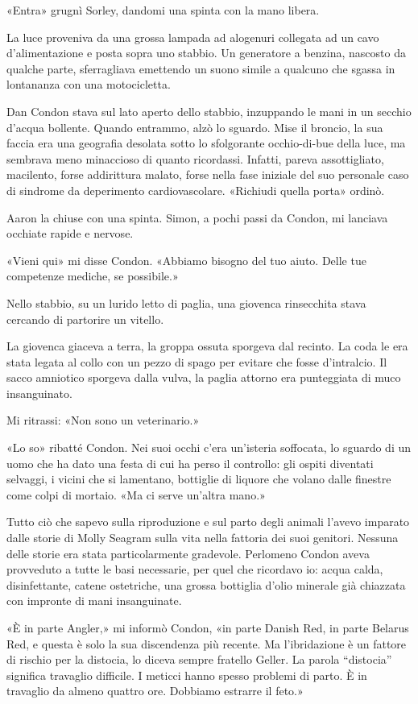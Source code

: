 «Entra» grugnì Sorley, dandomi una spinta con la mano libera.

La luce proveniva da una grossa lampada ad alogenuri collegata ad un
cavo d'alimentazione e posta sopra uno stabbio. Un generatore a benzina,
nascosto da qualche parte, sferragliava emettendo un suono simile a
qualcuno che sgassa in lontananza con una motocicletta.

Dan Condon stava sul lato aperto dello stabbio, inzuppando le mani in un
secchio d'acqua bollente. Quando entrammo, alzò lo sguardo. Mise il
broncio, la sua faccia era una geografia desolata sotto lo sfolgorante
occhio-di-bue della luce, ma sembrava meno minaccioso di quanto
ricordassi. Infatti, pareva assottigliato, macilento, forse addirittura
malato, forse nella fase iniziale del suo personale caso di sindrome da
deperimento cardiovascolare. «Richiudi quella porta» ordinò.

Aaron la chiuse con una spinta. Simon, a pochi passi da Condon, mi
lanciava occhiate rapide e nervose.

«Vieni qui» mi disse Condon. «Abbiamo bisogno del tuo aiuto. Delle tue
competenze mediche, se possibile.»

Nello stabbio, su un lurido letto di paglia, una giovenca rinsecchita
stava cercando di partorire un vitello.

La giovenca giaceva a terra, la groppa ossuta sporgeva dal recinto. La
coda le era stata legata al collo con un pezzo di spago per evitare che
fosse d'intralcio. Il sacco amniotico sporgeva dalla vulva, la paglia
attorno era punteggiata di muco insanguinato.

Mi ritrassi: «Non sono un veterinario.»

«Lo so» ribatté Condon. Nei suoi occhi c'era un'isteria soffocata, lo
sguardo di un uomo che ha dato una festa di cui ha perso il controllo:
gli ospiti diventati selvaggi, i vicini che si lamentano, bottiglie di
liquore che volano dalle finestre come colpi di mortaio. «Ma ci serve
un'altra mano.»

Tutto ciò che sapevo sulla riproduzione e sul parto degli animali
l'avevo imparato dalle storie di Molly Seagram sulla vita nella fattoria
dei suoi genitori. Nessuna delle storie era stata particolarmente
gradevole. Perlomeno Condon aveva provveduto a tutte le basi necessarie,
per quel che ricordavo io: acqua calda, disinfettante, catene
ostetriche, una grossa bottiglia d'olio minerale già chiazzata con
impronte di mani insanguinate.

«È in parte Angler,» mi informò Condon, «in parte Danish Red, in parte
Belarus Red, e questa è solo la sua discendenza più recente. Ma
l'ibridazione è un fattore di rischio per la distocia, lo diceva sempre
fratello Geller. La parola ``distocia'' significa travaglio difficile. I
meticci hanno spesso problemi di parto. È in travaglio da almeno quattro
ore. Dobbiamo estrarre il feto.»

